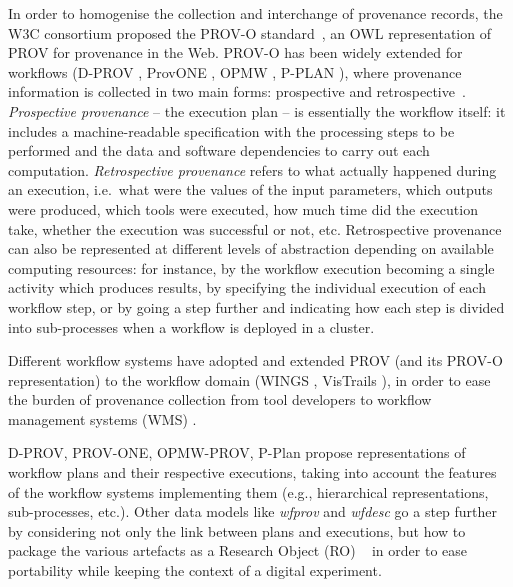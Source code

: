 \documentclass[10pt,letterpaper]{article}
\begin{document}
In order to homogenise the collection and interchange of provenance records, the W3C consortium proposed the PROV-O standard~\cite{Lebo 2013}, an OWL \cite{W3C OWL Working Group 2012} representation of PROV for provenance in the Web.
PROV-O has been widely extended for workflows (D-PROV \cite{Missier 2013}, ProvONE \cite{Cuevas-Vicenttín 2016}, OPMW \cite{Garijo 2011}, P-PLAN \cite{Garijo 2012}), where provenance information is collected in two main forms: prospective and retrospective~\cite{Freire 2008}. \emph{Prospective provenance} -- the execution plan -- is essentially the workflow itself: it includes a machine-readable specification with the processing steps to be performed and the data and software dependencies to carry out each computation.
\emph{Retrospective provenance} refers to what actually happened during an execution, i.e.~what were the values of the input parameters, which outputs were produced, which tools were executed, how much time did the execution take, whether the execution was successful or not, etc.
Retrospective provenance can also be represented at different levels of abstraction depending on available computing resources: for instance, by the workflow execution becoming a single activity which produces results, by specifying the individual execution of each workflow step, or by going a step further and indicating how each step is divided into sub-processes when a workflow is deployed in a cluster.

Different workflow systems have adopted and extended PROV (and its PROV-O representation) to the workflow domain (WINGS \cite{Gil 2011, Garijo 2014}, VisTrails \cite{Scheidegger 2008,Costa 2013}), in order to ease the burden of provenance collection from tool developers to workflow management systems (WMS) \cite{Atkinson 2017,Pérez 2018}.

D-PROV, PROV-ONE, OPMW-PROV, P-Plan propose representations of workflow plans and their respective executions, taking into account the features of the workflow systems implementing them (e.g., hierarchical representations, sub-processes, etc.).
Other data models like \emph{wfprov} and \emph{wfdesc}
\cite{Belhajjame 2015} go a step further by considering not only the link between plans and executions, but how to package the various artefacts as a Research Object (RO) ~\cite{Bechhofer 2013} in order to ease portability while keeping the context of a digital experiment.
\end{document}
